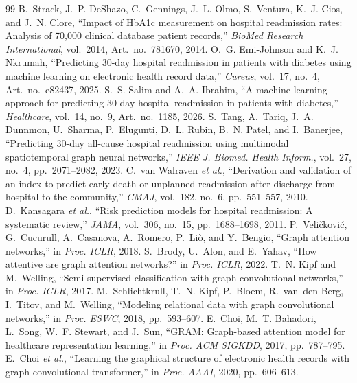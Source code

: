 \documentclass[conference]{IEEEtran}
\begin{document}
\begin{thebibliography}{99}\footnotesize
{} B.~Strack, J.~P. DeShazo, C.~Gennings, J.~L. Olmo, S.~Ventura, K.~J. Cios, and J.~N. Clore, ``Impact of HbA1c measurement on hospital readmission rates: Analysis of 70,000 clinical database patient records,'' \emph{BioMed Research International}, vol.~2014, Art.~no.~781670, 2014.
 O.~G. Emi-Johnson and K.~J. Nkrumah, ``Predicting 30-day hospital readmission in patients with diabetes using machine learning on electronic health record data,'' \emph{Cureus}, vol.~17, no.~4, Art.~no.~e82437, 2025.
 S.~S. Salim and A.~A. Ibrahim, ``A machine learning approach for predicting 30-day hospital readmission in patients with diabetes,'' \emph{Healthcare}, vol.~14, no.~9, Art.~no.~1185, 2026.
 S.~Tang, A.~Tariq, J.~A. Dunnmon, U.~Sharma, P.~Elugunti, D.~L. Rubin, B.~N. Patel, and I.~Banerjee, ``Predicting 30-day all-cause hospital readmission using multimodal spatiotemporal graph neural networks,'' \emph{IEEE J. Biomed. Health Inform.}, vol.~27, no.~4, pp.~2071--2082, 2023.
 C.~van Walraven \emph{et al.}, ``Derivation and validation of an index to predict early death or unplanned readmission after discharge from hospital to the community,'' \emph{CMAJ}, vol.~182, no.~6, pp.~551--557, 2010.
 D.~Kansagara \emph{et al.}, ``Risk prediction models for hospital readmission: A systematic review,'' \emph{JAMA}, vol.~306, no.~15, pp.~1688--1698, 2011.
 P.~Veli\v{c}kovi\'{c}, G.~Cucurull, A.~Casanova, A.~Romero, P.~Li\`{o}, and Y.~Bengio, ``Graph attention networks,'' in \emph{Proc. ICLR}, 2018.
 S.~Brody, U.~Alon, and E.~Yahav, ``How attentive are graph attention networks?'' in \emph{Proc. ICLR}, 2022.
 T.~N. Kipf and M.~Welling, ``Semi-supervised classification with graph convolutional networks,'' in \emph{Proc. ICLR}, 2017.
 M.~Schlichtkrull, T.~N. Kipf, P.~Bloem, R.~van~den Berg, I.~Titov, and M.~Welling, ``Modeling relational data with graph convolutional networks,'' in \emph{Proc. ESWC}, 2018, pp.~593--607.
 E.~Choi, M.~T. Bahadori, L.~Song, W.~F. Stewart, and J.~Sun, ``GRAM: Graph-based attention model for healthcare representation learning,'' in \emph{Proc. ACM SIGKDD}, 2017, pp.~787--795.
 E.~Choi \emph{et al.}, ``Learning the graphical structure of electronic health records with graph convolutional transformer,'' in \emph{Proc. AAAI}, 2020, pp.~606--613.

\end{thebibliography}
\end{document}
